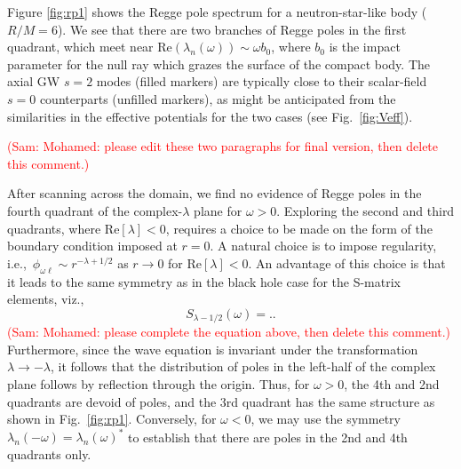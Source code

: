 \documentclass[aps,prd,longbibliography,reprint,twocolumn,amsmath,amssymb,amsfonts,showpacs,footnote,superscriptaddress]{revtex4-1}%
\newcommand{\sam}[1]{\textcolor{red}{(Sam: #1)}}
\begin{document}
Figure \ref{fig:rp1} shows the Regge pole spectrum for a neutron-star-like body ($R/M = 6$). We see that there are two branches of Regge poles in the first quadrant, which meet near $\text{Re}( \lambda_n(\omega) ) \sim \omega b_0$, where $b_0$ is the impact parameter for the null ray which grazes the surface of the compact body. The axial GW $s=2$ modes (filled markers) are typically close to their scalar-field $s=0$ counterparts (unfilled markers), as might be anticipated from the similarities in the effective potentials for the two cases (see Fig.~\ref{fig:Veff}). 

\sam{Mohamed: please edit these two paragraphs for final version, then delete this comment.}

After scanning across the domain, we find no evidence of Regge poles in the fourth quadrant of the complex-$\lambda$ plane for $\omega>0$. Exploring the second and third quadrants, where $\text{Re}[{\lambda}] < 0$, requires a choice to be made on the form of the boundary condition imposed at $r=0$. A natural choice is to impose regularity, i.e.,~$\phi_{\omega\ell} \sim r^{-\lambda+1/2}$ as $r \rightarrow 0$ for $\text{Re} [\lambda] < 0$. An advantage of this choice is that it leads to the same symmetry as in the black hole case for the S-matrix elements, viz.,
\begin{equation}
S_{\lambda - 1/2} (\omega) =. .
\end{equation}
\sam{Mohamed: please complete the equation above, then delete this comment.} 
Furthermore, since the wave equation is invariant under the transformation $\lambda \rightarrow -\lambda$, it follows that the distribution of poles in the left-half of the complex plane follows by reflection through the origin. Thus, for $\omega > 0$, the 4th and 2nd quadrants are devoid of poles, and the 3rd quadrant has the same structure as shown in Fig.~\ref{fig:rp1}. 
Conversely, for $\omega < 0$, we may use the symmetry $\lambda_n(-\omega) = \lambda_n(\omega)^*$ to establish that there are poles in the 2nd and 4th quadrants only.
\end{document}
